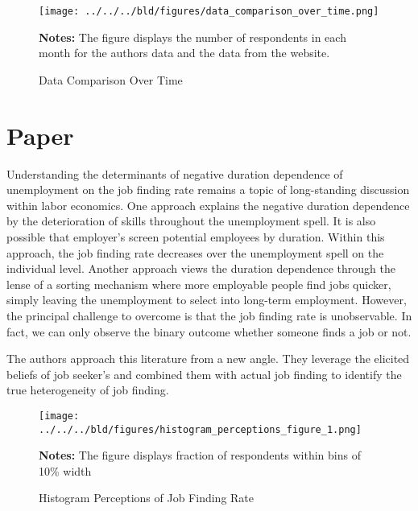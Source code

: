 \documentclass[11pt,a4paper,leqno]{article}
\begin{document}
\begin{figure}[!htbp] \centering
	\texttt{[image: ../../../bld/figures/data\_comparison\_over\_time.png]}
	\begin{minipage}[center]{0.75\textwidth}
		\caption*{\footnotesize \textbf{Notes:} The figure displays the number of respondents in each month for the authors data and the data from the website.}
	\end{minipage}
  \caption{Data Comparison Over Time}
\label{fig:comp_over_time}
\end{figure}

\section{Paper} \label{sec:paper}

Understanding the determinants of negative duration dependence of unemployment on the job finding rate remains a topic of long-standing discussion within labor economics.  One approach explains the negative duration dependence by the deterioration of skills throughout the unemployment spell. It is also possible that employer's screen potential employees by duration. Within this approach, the job finding rate decreases over the unemployment spell on the individual level. Another approach views the duration dependence through the lense of a sorting mechanism where more employable people find jobs quicker, simply leaving the unemployment to select into long-term employment. However, the principal challenge to overcome is that the job finding rate is unobservable. In fact, we can only observe the binary outcome whether someone finds a job or not. 

The authors approach this literature from a new angle. They leverage the elicited beliefs of job seeker's and combined them with actual job finding to identify the true heterogeneity of job finding.
 


\begin{figure}[!htbp] \centering
	\texttt{[image: ../../../bld/figures/histogram\_perceptions\_figure\_1.png]}
	\begin{minipage}[center]{\textwidth}
		\caption*{\footnotesize \textbf{Notes:} The figure displays fraction of respondents within bins of 
		10\% width}
	\end{minipage}
	\caption{Histogram Perceptions of Job Finding Rate}
	\label{fig:percep_hist}
\end{figure}
\end{document}
